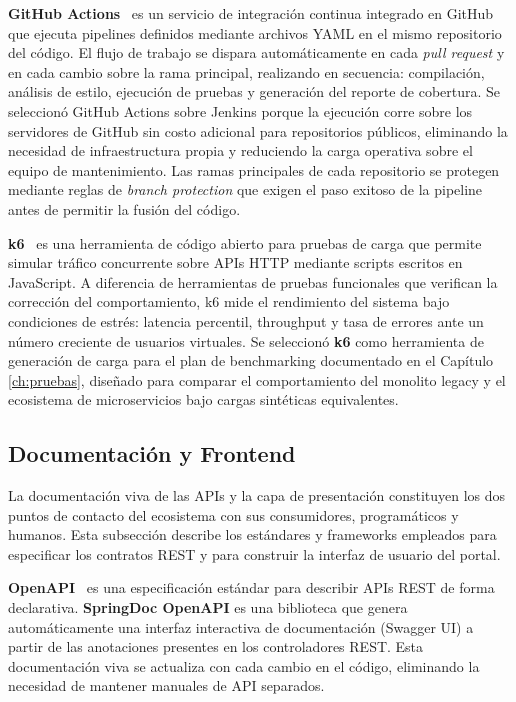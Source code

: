 \textbf{GitHub Actions}~\cite{githubactions2024} es un servicio de integraci\'{o}n continua integrado en GitHub que ejecuta pipelines definidos mediante archivos YAML en el mismo repositorio del c\'{o}digo. El flujo de trabajo se dispara autom\'{a}ticamente en cada \textit{pull request} y en cada cambio sobre la rama principal, realizando en secuencia: compilaci\'{o}n, an\'{a}lisis de estilo, ejecuci\'{o}n de pruebas y generaci\'{o}n del reporte de cobertura. Se seleccion\'{o} GitHub Actions sobre Jenkins porque la ejecuci\'{o}n corre sobre los servidores de GitHub sin costo adicional para repositorios p\'{u}blicos, eliminando la necesidad de infraestructura propia y reduciendo la carga operativa sobre el equipo de mantenimiento. Las ramas principales de cada repositorio se protegen mediante reglas de \textit{branch protection} que exigen el paso exitoso de la pipeline antes de permitir la fusi\'{o}n del c\'{o}digo.

\textbf{k6}~\cite{k62024} es una herramienta de c\'{o}digo abierto para pruebas de carga que permite simular tr\'{a}fico concurrente sobre APIs HTTP mediante scripts escritos en JavaScript. A diferencia de herramientas de pruebas funcionales que verifican la correcci\'{o}n del comportamiento, k6 mide el rendimiento del sistema bajo condiciones de estr\'{e}s: latencia percentil, throughput y tasa de errores ante un n\'{u}mero creciente de usuarios virtuales. Se seleccion\'{o} \textbf{k6} como herramienta de generaci\'{o}n de carga para el plan de benchmarking documentado en el Cap\'{i}tulo \ref{ch:pruebas}, dise\~{n}ado para comparar el comportamiento del monolito legacy y el ecosistema de microservicios bajo cargas sint\'{e}ticas equivalentes.

\subsection{Documentaci\'{o}n y Frontend}

La documentaci\'{o}n viva de las APIs y la capa de presentaci\'{o}n constituyen los dos puntos de contacto del ecosistema con sus consumidores, program\'{a}ticos y humanos. Esta subsecci\'{o}n describe los est\'{a}ndares y frameworks empleados para especificar los contratos REST y para construir la interfaz de usuario del portal.

\textbf{OpenAPI}~\cite{openapi2024} es una especificaci\'{o}n est\'{a}ndar para describir APIs REST de forma declarativa. \textbf{SpringDoc OpenAPI} es una biblioteca que genera autom\'{a}ticamente una interfaz interactiva de documentaci\'{o}n (Swagger UI) a partir de las anotaciones presentes en los controladores REST. Esta documentaci\'{o}n viva se actualiza con cada cambio en el c\'{o}digo, eliminando la necesidad de mantener manuales de API separados.

